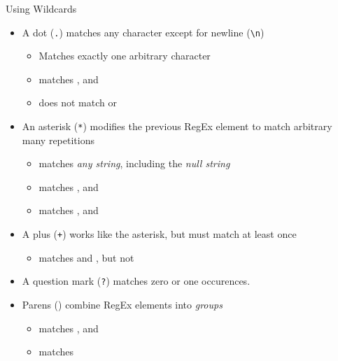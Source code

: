 \begin{frame}{Using Wildcards}
%
\begin{itemize}
\item A dot (\texttt{.}) matches any character except for newline	(\texttt{\textbackslash n})
	\begin{itemize}
	\item Matches exactly one arbitrary character
	\item[\Thus]  matches ,  and 
	\item[\Thus]  does not match  or 
	\end{itemize}
\pause
\item An asterisk (\texttt{*}) modifies the previous RegEx element to match arbitrary many repetitions
	\begin{itemize}
	\item[\Thus]  matches \emph{any string}, including the \emph{null string}
	\item[\Thus]  matches ,  and 
	\item[\Thus]  matches ,  and 
	\end{itemize}
\pause
\item A plus (\texttt{+}) works like the asterisk, but must match at least once
	\begin{itemize}
	\item[\Thus]  matches  and , but not  
	\end{itemize}
\item A question mark (\texttt{?}) matches zero or one occurences.
\pause
\item Parens () combine RegEx elements into \emph{groups}
	\begin{itemize}
	\item {} matches ,  and \qtt{}
	\item {} matches 
	\end{itemize}
\end{itemize}
%
\end{frame}


